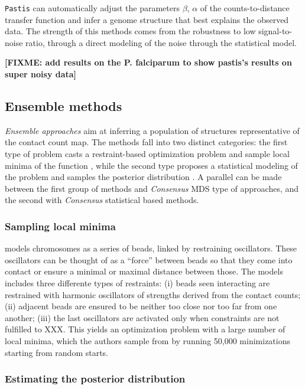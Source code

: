 \documentclass[letterpaper,12pt]{article}
\newcommand{\fixme}[1]{\textbf{[FIXME: #1]}}
\begin{document}
\texttt{Pastis} can automatically adjust the parameters $\beta$, $\alpha$ of
the counts-to-distance transfer function and infer a genome structure that
best explains the observed data. The strength of this methods comes from the
robustness to low signal-to-noise ratio, through a direct modeling of the
noise through the statistical model.

\fixme{add results on the P. falciparum to show pastis's results on 
super noisy data}

\subsection*{Ensemble methods}

{\em Ensemble approaches} aim at inferring a population of structures
representative of the contact count map. The methods fall into two distinct
categories: the first type of problem casts a restraint-based 
optimization problem and sample local minima of the function
\citep{bau:three-dimensional, umbarger:three-dimensional}, while the second
type proposes a statistical modeling of the problem and samples the posterior
distribution \citep{rousseau:three, hu:bayesian}. A parallel can be made
between the first group of methods and {\em Consensus} MDS type of approaches,
and the second with {\em Consensus} statistical based methods.

\subsubsection*{Sampling local minima}

\citet{umbarger:three-dimensional,bau:three-dimensional, kalhor:genome} models
chromosomes as a series of beads, linked by restraining oscillators. These
oscillators can be thought of as a ``force'' between beads so that they come
into contact or ensure a minimal or maximal distance between those. The models
includes three differente types of restraints: (i) beads seen interacting are
restrained with harmonic oscillators of strengths derived from the contact
counts; (ii) adjacent beads are ensured to be neither too close nor too far
from one another; (iii) the last oscillators are activated only when
constraints are not fulfilled to XXX.  This yields an optimization problem
with a large number of local minima, which the authors sample from by running
50,000 minimizations starting from random starts.

\subsubsection*{Estimating the posterior distribution}
\end{document}
